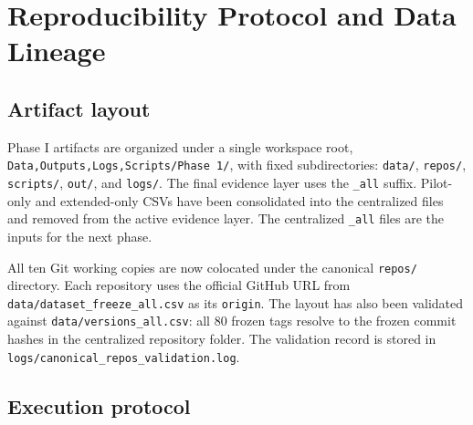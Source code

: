 \section{Reproducibility Protocol and Data Lineage}
\label{sec:reproducibility}

\subsection{Artifact layout}
\label{sec:repro_layout}

Phase I artifacts are organized under a single workspace root, \texttt{Data,Outputs,Logs,Scripts/Phase 1/},
with fixed subdirectories: \texttt{data/}, \texttt{repos/}, \texttt{scripts/}, \texttt{out/}, and
\texttt{logs/}. The final evidence layer uses the \texttt{\_all} suffix. Pilot-only and extended-only
CSVs have been consolidated into the centralized files and removed from the active evidence layer.
The centralized \texttt{\_all} files are the inputs for the next phase.

All ten Git working copies are now colocated under the canonical \texttt{repos/} directory. Each repository
uses the official GitHub URL from \texttt{data/dataset\_freeze\_all.csv} as its \texttt{origin}. The layout
has also been validated against \texttt{data/versions\_all.csv}: all 80 frozen tags resolve to the frozen
commit hashes in the centralized repository folder. The validation record is stored in
\texttt{logs/canonical\_repos\_validation.log}.

\subsection{Execution protocol}
\label{sec:repro_execution}

